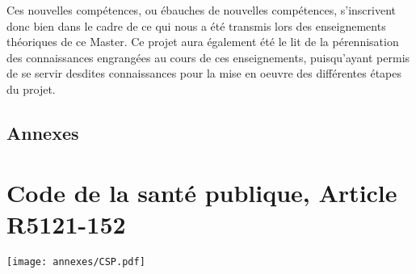 \documentclass[a4paper, 12pt, openany, oneside, abstract=on]{article} %
\begin{document}
Ces nouvelles compétences, ou ébauches de nouvelles compétences, s'inscrivent donc bien dans le cadre de ce qui nous a été transmis lors des enseignements théoriques de ce Master. Ce projet aura également été le lit de la pérennisation des connaissances engrangées au cours de ces enseignements, puisqu'ayant permis de se servir desdites connaissances pour la mise en oeuvre des différentes étapes du projet.

\newpage
\pagestyle{empty}



\subsection*{Annexes}
\appendix

\section{Code de la santé publique, Article R5121-152}
\begin{minipage}{0.7\linewidth}
\texttt{[image: annexes/CSP.pdf]}
\captionof{\label{app:CSP5121}}
\end{minipage}
\end{document}
